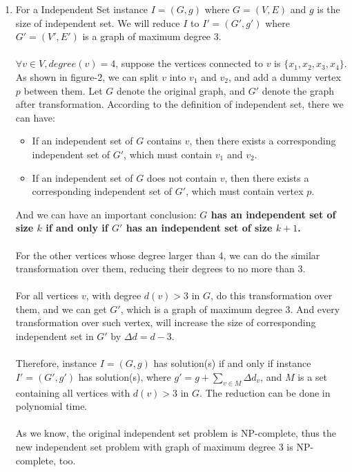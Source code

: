 \documentclass{article}
\newcommand{\<}{
    \langle}
\renewcommand{\>}{
    \rangle}
\begin{document}
{\begin{enumerate}[label=\arabic*)]
    \item For a Independent Set instance $I = (G, g)$ where $G = (V,E)$ and $g$ is the size of independent set. We will reduce $I$ to $I'=(G', g')$ where $G' = (V', E')$ is a graph of maximum degree 3. 
    \\ \\
    $\forall{v \in V, degree(v) = 4}$, suppose the vertices connected to $v$ is $\{x_1, x_2, x_3, x_4\}$. As shown in figure-2, we can split $v$ into $v_1$ and $v_2$, and add a dummy vertex $p$ between them. Let $G$ denote the original graph, and $G'$ denote the graph after transformation. According to the definition of independent set, there we can have:
    \begin{itemize}
        \item If an independent set of $G$ contains $v$, then there exists a corresponding independent set of $G'$, which must contain $v_1$ and $v_2$.
        \item If an independent set of $G$ does not contain $v$, then there exists a corresponding independent set of $G'$, which must contain vertex $p$.
    \end{itemize}
    And we can have an important conclusion: \textbf{$G$ has an independent set of size $k$ if and only if $G'$ has an independent set of size $k+1$.} 
    \\ \\
    For the other vertices whose degree larger than 4, we can do the similar transformation over them, reducing their degrees to no more than 3.
    \\ \\
    For all vertices $v$, with degree $d(v) > 3$ in $G$, do this transformation over them, and we can get $G'$, which is a graph of maximum degree 3. And every transformation over such vertex, will increase the size of corresponding independent set in $G'$ by $\Delta{d} = d-3$. 
    \\ \\ 
    Therefore, instance $I = (G, g)$ has solution(s) if and only if instance  $I'=(G', g')$ has solution(s), where $g' = g + \sum_{v \in M}{\Delta{d_v}}$, and $M$ is a set containing all vertices with $d(v) > 3$ in $G$. The reduction can be done in polynomial time.
    \\ \\
    As we know, the original independent set problem is NP-complete, thus the new independent set problem with graph of maximum degree 3 is NP-complete, too.
\end{enumerate}

}
\end{document}
